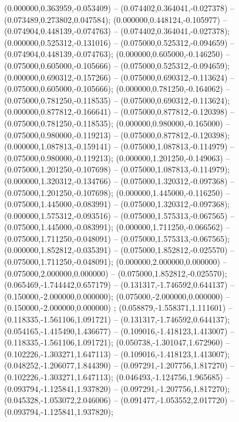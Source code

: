  (0.000000,0.363959,-0.053409) -- (0.074402,0.364041,-0.027378) -- (0.073489,0.273802,0.047584);
 (0.000000,0.448124,-0.105977) -- (0.074904,0.448139,-0.074763) -- (0.074402,0.364041,-0.027378);
 (0.000000,0.525312,-0.131016) -- (0.075000,0.525312,-0.094659) -- (0.074904,0.448139,-0.074763);
 (0.000000,0.605000,-0.146250) -- (0.075000,0.605000,-0.105666) -- (0.075000,0.525312,-0.094659);
 (0.000000,0.690312,-0.157266) -- (0.075000,0.690312,-0.113624) -- (0.075000,0.605000,-0.105666);
 (0.000000,0.781250,-0.164062) -- (0.075000,0.781250,-0.118535) -- (0.075000,0.690312,-0.113624);
 (0.000000,0.877812,-0.166641) -- (0.075000,0.877812,-0.120398) -- (0.075000,0.781250,-0.118535);
 (0.000000,0.980000,-0.165000) -- (0.075000,0.980000,-0.119213) -- (0.075000,0.877812,-0.120398);
 (0.000000,1.087813,-0.159141) -- (0.075000,1.087813,-0.114979) -- (0.075000,0.980000,-0.119213);
 (0.000000,1.201250,-0.149063) -- (0.075000,1.201250,-0.107698) -- (0.075000,1.087813,-0.114979);
 (0.000000,1.320312,-0.134766) -- (0.075000,1.320312,-0.097368) -- (0.075000,1.201250,-0.107698);
 (0.000000,1.445000,-0.116250) -- (0.075000,1.445000,-0.083991) -- (0.075000,1.320312,-0.097368);
 (0.000000,1.575312,-0.093516) -- (0.075000,1.575313,-0.067565) -- (0.075000,1.445000,-0.083991);
 (0.000000,1.711250,-0.066562) -- (0.075000,1.711250,-0.048091) -- (0.075000,1.575313,-0.067565);
 (0.000000,1.852812,-0.035391) -- (0.075000,1.852812,-0.025570) -- (0.075000,1.711250,-0.048091);
 (0.000000,2.000000,0.000000) -- (0.075000,2.000000,0.000000) -- (0.075000,1.852812,-0.025570);
 (0.065469,-1.744442,0.657179) -- (0.131317,-1.746592,0.644137) -- (0.150000,-2.000000,0.000000);
 (0.075000,-2.000000,0.000000) -- (0.150000,-2.000000,0.000000) ;
 (0.058879,-1.558371,1.111601) -- (0.118335,-1.561106,1.091721) -- (0.131317,-1.746592,0.644137);
 (0.054165,-1.415490,1.436677) -- (0.109016,-1.418123,1.413007) -- (0.118335,-1.561106,1.091721);
 (0.050738,-1.301047,1.672960) -- (0.102226,-1.303271,1.647113) -- (0.109016,-1.418123,1.413007);
 (0.048252,-1.206077,1.844390) -- (0.097291,-1.207756,1.817270) -- (0.102226,-1.303271,1.647113);
 (0.046493,-1.124756,1.965685) -- (0.093794,-1.125841,1.937820) -- (0.097291,-1.207756,1.817270);
 (0.045328,-1.053072,2.046006) -- (0.091477,-1.053552,2.017720) -- (0.093794,-1.125841,1.937820);
